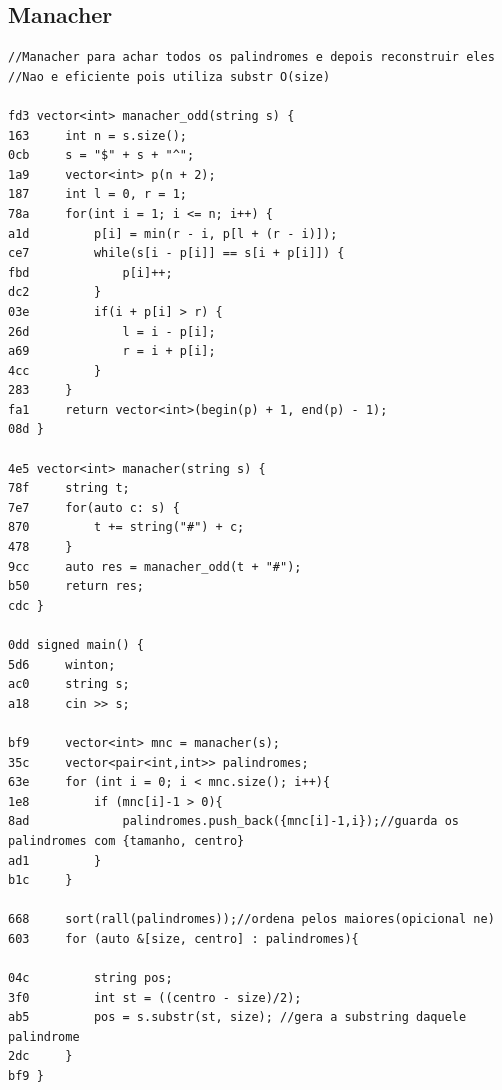 \documentclass[11pt, a4paper, twoside]{article}
\begin{document}
\subsection{Manacher}
\begin{lstlisting}
//Manacher para achar todos os palindromes e depois reconstruir eles
//Nao e eficiente pois utiliza substr O(size)

fd3 vector<int> manacher_odd(string s) {
163     int n = s.size();
0cb     s = "$" + s + "^";
1a9     vector<int> p(n + 2);
187     int l = 0, r = 1;
78a     for(int i = 1; i <= n; i++) {
a1d         p[i] = min(r - i, p[l + (r - i)]);
ce7         while(s[i - p[i]] == s[i + p[i]]) {
fbd             p[i]++;
dc2         }
03e         if(i + p[i] > r) {
26d             l = i - p[i];
a69             r = i + p[i];
4cc         }
283     }
fa1     return vector<int>(begin(p) + 1, end(p) - 1);
08d }

4e5 vector<int> manacher(string s) {
78f     string t;
7e7     for(auto c: s) {
870         t += string("#") + c;
478     }
9cc     auto res = manacher_odd(t + "#");
b50     return res;
cdc }

0dd signed main() {
5d6     winton;
ac0     string s;
a18     cin >> s;
    
bf9     vector<int> mnc = manacher(s);
35c     vector<pair<int,int>> palindromes;
63e     for (int i = 0; i < mnc.size(); i++){
1e8         if (mnc[i]-1 > 0){
8ad             palindromes.push_back({mnc[i]-1,i});//guarda os palindromes com {tamanho, centro}
ad1         }
b1c     }
    
668     sort(rall(palindromes));//ordena pelos maiores(opicional ne)
603     for (auto &[size, centro] : palindromes){
    
04c         string pos;
3f0         int st = ((centro - size)/2);
ab5         pos = s.substr(st, size); //gera a substring daquele palindrome
2dc     }
bf9 }
\end{lstlisting}
\end{document}
